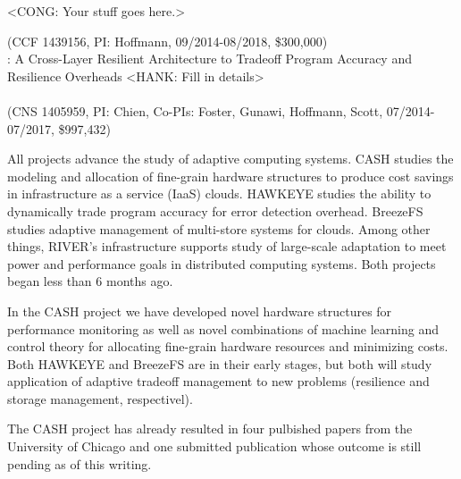 <CONG: Your stuff goes here.>


\vspace{0.05cm}

 (CCF 1439156, PI: Hoffmann, 09/2014-08/2018, \$300,000)\\
: A Cross-Layer Resilient Architecture to Tradeoff Program Accuracy and Resilience Overheads <HANK: Fill in details>\\
 \\
 (CNS 1405959, PI: Chien, Co-PIs: Foster, Gunawi, Hoffmann, Scott, 07/2014-07/2017, \$997,432) 

All projects advance the study of adaptive computing systems.  CASH
studies the modeling and allocation of fine-grain hardware structures
to produce cost savings in infrastructure as a service (IaaS) clouds.
HAWKEYE studies the ability to dynamically trade program accuracy for
error detection overhead.  BreezeFS studies adaptive management of
multi-store systems for clouds.  Among other things, RIVER's
infrastructure supports study of large-scale adaptation to meet power
and performance goals in distributed computing systems.  Both projects
began less than 6 months ago.

 In the CASH project we have
developed novel hardware structures for performance monitoring as well
as novel combinations of machine learning and control theory for
allocating fine-grain hardware resources and minimizing costs.  Both
HAWKEYE and BreezeFS are in their early stages, but both will study
application of adaptive tradeoff management to new problems
(resilience and storage management, respectivel).  

 The CASH project has already resulted
in four pulbished papers from the University of Chicago
\cite{cpsna,POET,FSE2015,JouleGuard} and one submitted publication
whose outcome is still pending as of this writing.
